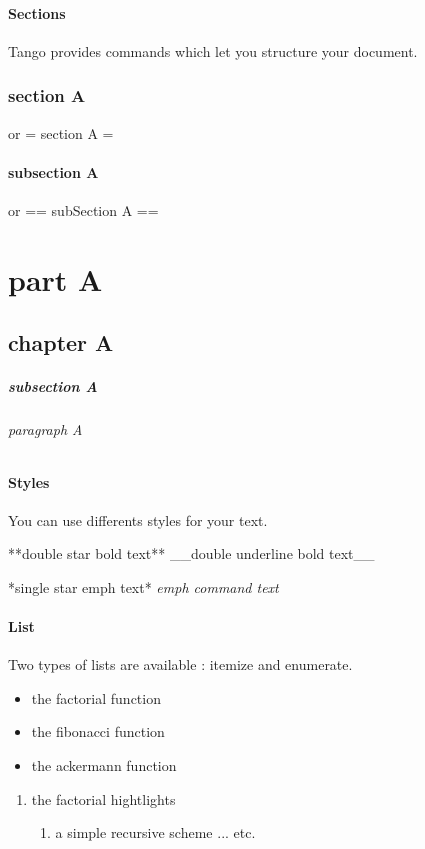 \subsection{Sections}
Tango provides commands which let you structure your document.
\begin{code}[langague=tango]
  \section{section A} or = section A =
  \subsection{subsection A} or == subSection A ==
  \part{part A}
  \chapter{chapter A}
  \subsubsection{subsection A}
  \paragraph{paragraph A}
\end{code}

\subsection{Styles}
You can use differents styles for your text.
\begin{code}[langague=tango]
  **double star bold text**
  __double underline bold text__

  *single star emph text*
  \emph{emph command text}
\end{code}

\subsection{List}
Two types of lists are available : itemize and enumerate.

\begin{code}[langague=tango]
  \begin{itemize}
  \item the factorial function
  \item the fibonacci function
  \item the ackermann function
  \end{itemize}

  \begin{enumerate}
  \item the factorial hightlights
    \begin{enumerate}
    \item a simple recursive scheme
      ... etc.
    \end{enumerate}
  \end{enumerate}
\end{code}



